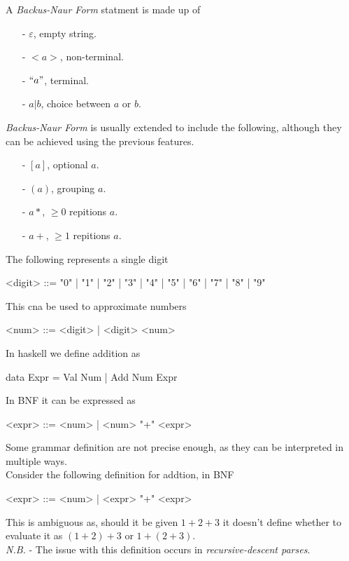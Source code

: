 \documentclass[11pt,a4paper]{article}
\begin{document}
A \textit{Backus-Naur Form} statment is made up of
\begin{itemize}
  \item[-]$\varepsilon$, empty string.
  \item[-]$<a>$, non-terminal.
  \item[-]$``a"$, terminal.
  \item[-] $a|b$, choice between $a$ or $b$.
\end{itemize}

\textit{Backus-Naur Form} is usually extended to include the following, although they can be achieved using the previous features.
\begin{itemize}
  \item[-] $[a]$, optional $a$.
  \item[-] $(a)$, grouping $a$.
  \item[-] $a*$, $\geq0$ repitions $a$.
  \item[-] $a+$, $\geq1$ repitions $a$.
\end{itemize}

The following represents a single digit
\begin{code}
<digit> ::= "0" | "1" | "2" | "3" | "4" | "5" | "6" | "7" | "8" | "9"
\end{code}
This cna be used to approximate numbers
\begin{code}
<num> ::= <digit>
        | <digit> <num>
\end{code}

In haskell we define addition as
\begin{code}
data Expr = Val Num
          | Add Num Expr
\end{code}
In BNF it can be expressed as
\begin{code}
<expr> ::= <num>
         | <num> "+" <expr>
\end{code}

Some grammar definition are not precise enough, as they can be interpreted in multiple ways.\\

Consider the following definition for addtion, in BNF
\begin{code}
<expr> ::= <num>
         | <expr> "+" <expr>
\end{code}
This is ambiguous as, should it be given $1+2+3$ it doesn't define whether to evaluate it as $(1+2)+3$ or $1+(2+3)$.\\
\textit{N.B.} - The issue with this definition occurs in \textit{recursive-descent parses}. %
\end{document}
